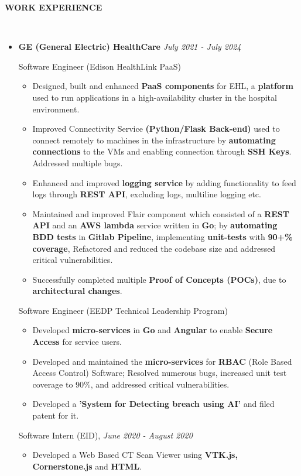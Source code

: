 \documentclass[a4paper,10pt]{article}
\newcommand{\isep}{-2 pt}
\newcommand{\lsep}{-0.6cm}
\newcommand{\resheading}[1]{{\small \colorbox{mygrey}{\begin{minipage}{0.975\textwidth}{\textbf{#1 \vphantom{p\^{E}}}}\end{minipage}}}}
\begin{document}
\resheading{\textbf{WORK EXPERIENCE} }\\[\lsep]
\vspace{1.0pt}
\begin{itemize}
\item \textbf{GE (General Electric) HealthCare} \hfill \emph{July 2021 - July 2024}
\setlength{\itemsep}{1pt}
\setlength{\parskip}{0pt}
\setlength{\parsep}{0pt}

Software Engineer (Edison HealthLink PaaS)
	\begin{itemize}\itemsep \isep
	\item Designed, built and enhanced \textbf{PaaS components} for EHL, a \textbf{platform} used to run applications in a high-availability cluster in the hospital environment. 
    \item Improved Connectivity Service \textbf{(Python/Flask Back-end)} used to connect remotely to machines in the infrastructure by \textbf{automating connections} to the VMs and enabling connection through \textbf{SSH Keys}. Addressed multiple bugs.
    \item Enhanced and improved \textbf{logging service} by adding functionality to feed logs through \textbf{REST API}, excluding logs, multiline logging etc.
    \item Maintained and improved Flair component which consisted of a \textbf{REST API} and an \textbf{AWS lambda} service written in \textbf{Go}; by \textbf{automating BDD tests} in \textbf{Gitlab Pipeline}, implementing \textbf{unit-tests} with \textbf{90+\% coverage}, Refactored and reduced the codebase size and addressed critical vulnerabilities. 
    \item Successfully completed multiple \textbf{Proof of Concepts (POCs)}, due to \textbf{architectural changes}.
	\end{itemize}

Software Engineer (EEDP Technical Leadership Program)
	\begin{itemize}\itemsep \isep
	\item Developed \textbf{micro-services} in \textbf{Go} and \textbf{Angular} to enable \textbf{Secure Access} for service users.
    \item Developed and maintained the \textbf{micro-services} for \textbf{RBAC} (Role Based Access Control) Software; Resolved numerous bugs, increased unit test coverage to 90\%, and addressed critical vulnerabilities.
	\item  Developed a \textbf{'System for Detecting breach using AI'} and filed patent for it.
	\end{itemize}
 
Software Intern (EID), \hfill \emph{June 2020 - August 2020}
	\begin{itemize}\itemsep \isep
	\item  Developed a Web Based CT Scan Viewer using \textbf{VTK.js, Cornerstone.js} and \textbf{HTML}.
	\end{itemize}
\end{itemize}
\end{document}
